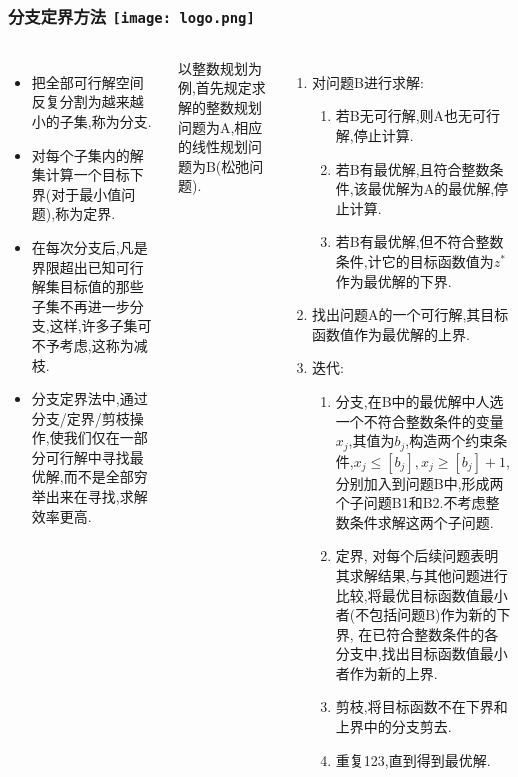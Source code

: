\begin{comment}
\end{comment}
\begin{frame}
\frametitle{分支定界方法 \hfill \texttt{[image: logo.png]}}
\begin{columns}
	\begin{itemize}
		\item 把全部可行解空间反复分割为越来越小的子集,称为{\color{red}分支}.
		\item 对每个子集内的解集计算一个目标下界(对于最小值问题),称为{\color{red}定界}.
		\item 在每次分支后,凡是界限超出已知可行解集目标值的那些子集不再进一步分支,这样,许多子集可不予考虑,这称为{\color{red}减枝}.
		\item 分支定界法中,通过分支/定界/剪枝操作,使我们仅在一部分可行解中寻找最优解,而不是全部穷举出来在寻找,求解效率更高.
	\end{itemize}
	以整数规划为例,首先规定求解的整数规划问题为A,相应的线性规划问题为B(松弛问题).
	\begin{enumerate}
		\item 对问题B进行求解:
		\begin{enumerate}
			\item 若B无可行解,则A也无可行解,停止计算.
			\item 若B有最优解,且符合整数条件,该最优解为A的最优解,停止计算.
			\item 若B有最优解,但不符合整数条件,计它的目标函数值为$z^*$作为最优解的{\color{red}下界}.
		\end{enumerate}
		\item 找出问题A的一个可行解,其目标函数值作为最优解的{\color{red}上界}.
		\item 迭代:
		\begin{enumerate}
			\item 分支,在B中的最优解中人选一个不符合整数条件的变量$x_j$,其值为$b_j$,构造两个约束条件,$x_j \leq [b_j], x_j \geq [b_j] + 1$,分别加入到问题B中,形成两个子问题B1和B2.不考虑整数条件求解这两个子问题.
			\item 定界, 对每个后续问题表明其求解结果,与其他问题进行比较,将最优目标函数值最小者(不包括问题B)作为新的下界,
			在已符合整数条件的各分支中,找出目标函数值最小者作为新的上界.
			\item 剪枝,将目标函数不在下界和上界中的分支剪去.
			\item 重复123,直到得到最优解.
		\end{enumerate}
	\end{enumerate}

\end{columns}
\end{frame}

